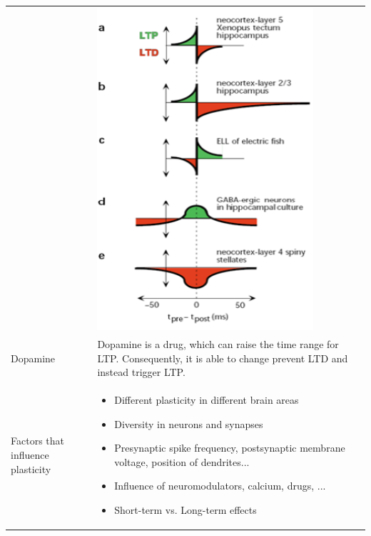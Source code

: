 \begin{longtable}{p{4cm}p{15cm}}
			& \includegraphics[width = 8cm]{neuroinf_stdp.png}\\
Dopamine		& Dopamine is a drug, which can raise the time range for LTP. Consequently, it is able to change prevent LTD and instead trigger LTP.\\
Factors that influence plasticity	& \begin{itemize}
                                 	  	\item Different plasticity in different brain areas
						\item Diversity in neurons and synapses
						\item Presynaptic spike frequency, postsynaptic membrane voltage, position of dendrites...
						\item Influence of neuromodulators, calcium, drugs, ...
						\item Short-term vs. Long-term effects
                                 	  \end{itemize}

\end{longtable}